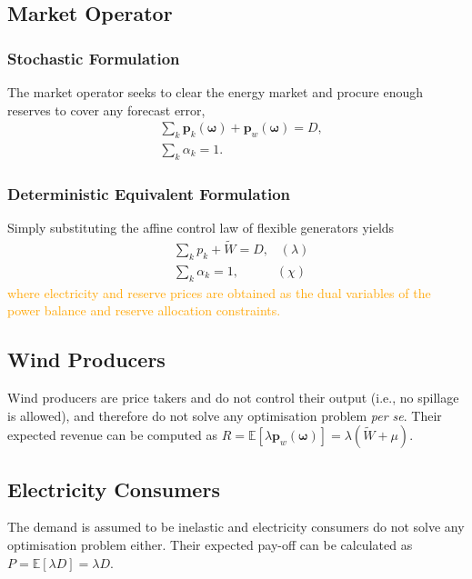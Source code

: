 \documentclass{article}
\begin{document}
\subsection{Market Operator}

\subsubsection{Stochastic Formulation}

The market operator seeks to clear the energy market and procure enough reserves to cover any forecast error,
\begin{align}
& \sum_k \mathbf{p}_k(\boldsymbol{\omega}) + \mathbf{p}_w(\boldsymbol{\omega}) = D,\\
& \sum_k \alpha_k = 1.
\end{align}

\subsubsection{Deterministic Equivalent Formulation}

Simply substituting the affine control law of flexible generators yields
\begin{align}
& \sum_k p_k + \tilde{W} = D, \hspace{10pt} (\lambda)\\
& \sum_k \alpha_k = 1, \hspace{35pt} (\chi)
\end{align}
\textcolor{orange}{where electricity and reserve prices are obtained as the dual variables of the power balance and reserve allocation constraints.}
\subsection{Wind Producers}

Wind producers are price takers and do not control their output (i.e., no spillage is allowed), and therefore do not solve any optimisation problem \textit{per se}. Their expected revenue can be computed as $R = \mathbb{E}[\lambda \mathbf{p}_w(\boldsymbol{\omega})] = \lambda(\tilde{W} + \mu)$.

\subsection{Electricity Consumers}

The demand is assumed to be inelastic and electricity consumers do not solve any optimisation problem either. Their expected pay-off can be calculated as $P = \mathbb{E}[\lambda D] = \lambda D$.
\end{document}
